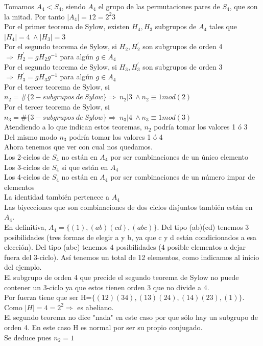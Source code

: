 \documentclass[nochap]{apuntes}
\begin{document}
\begin{example}
 Tomamos $A_4<S_4$, siendo $A_4$  el grupo de las permutaciones pares de $S_4$, que son la mitad. Por tanto $|A_4|=12=2^{2}3$\\
 Por el primer teorema de Sylow, existen $H_4, H_3$  subgrupos de $A_4$  tales que $|H_4|=4 \ \wedge |H_3|=3$\\
 Por el segundo teorema de Sylow, si $H_2, H_2^{'}$  son subgrupos de orden 4 $\Rightarrow \ H_2^{'}=gH_2g^{-1}$  para algún $g\in A_4$\\
 Por el segundo teorema de Sylow, si $H_3, H_3^{'}$  son subgrupos de orden 3 $\Rightarrow \ H_3^{'}=gH_3g^{-1}$  para algún $g\in A_4$\\
 Por el tercer teorema de Sylow, si $n_2=\#\{2-subgrupos \ de \ Sylow \} \Rightarrow \ n_2|3 \ \wedge n_2\equiv 1 mod(2)$\\
 Por el tercer teorema de Sylow, si $n_3=\#\{3-subgrupos \ de \ Sylow \} \Rightarrow \ n_3|4 \ \wedge n_3\equiv 1 mod(3)$\\
 Atendiendo a lo que indican estos teoremas, $n_2$  podría tomar los valores 1 ó 3\\
 Del mismo modo $n_3$  podría tomar los valores 1 ó 4\\
 Ahora tenemos que ver con cual nos quedamos.\\
 Los 2-ciclos de $S_4$  no están en $A_4$  por ser combinaciones de un único elemento\\
 Los 3-ciclos de $S_4$  si que están en $A_4$\\
 Los 4-ciclos de $S_4$  no están en $A_4$  por ser combinaciones de un número impar de elementos\\
 La identidad también pertenece a $A_4$\\
 Las biyecciones que son combinaciones de dos ciclos disjuntos también están en $A_4$.\\
 En definitiva, $A_4=\{(1), (ab)(cd), (abc)\}$. Del tipo (ab)(cd) tenemos 3 posibilidades (tres formas de elegir a y b, ya que c y d
 están condicionados a esa elección). Del tipo (abc) tenemos 4 posibilidades (4 posible elementos a dejar fuera del 3-ciclo). Así tenemos un
 total de 12 elementos, como indicamos al inicio del ejemplo.\\
 
 El subgrupo de orden 4 que precide el segundo teorema de Sylow no puede contener un 3-ciclo ya que estos tienen orden 3 que no divide
 a 4.\\
 Por fuerza tiene que ser H=$\{(12)(34), (13)(24), (14)(23), (1)\}$. Como $|H|=4=2^{2} \Rightarrow$  es abeliano.\\
 El segundo teorema no dice "nada" en este caso por que sólo hay un subgrupo de orden 4. En este caso H es normal por ser su propio
 conjugado.\\
 Se deduce pues $n_2=1$\\
 

\end{example}
\end{document}
